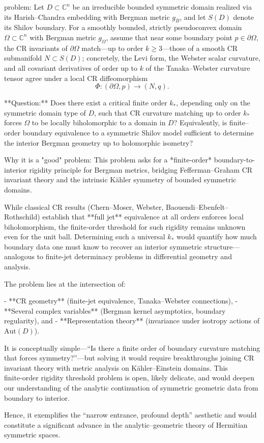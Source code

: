 problem:  
Let \( D \subset \mathbb{C}^n \) be an irreducible bounded symmetric domain realized via its Harish–Chandra embedding with Bergman metric \( g_B \), and let \( S(D) \) denote its Shilov boundary. For a smoothly bounded, strictly pseudoconvex domain \( \Omega \subset \mathbb{C}^n \) with Bergman metric \( g_\Omega \), assume that near some boundary point \( p \in \partial\Omega \), the CR invariants of \( \partial\Omega \) match—up to order \( k \ge 3 \)—those of a smooth CR submanifold \( N \subset S(D) \); concretely, the Levi form, the Webster scalar curvature, and all covariant derivatives of order up to \( k \) of the Tanaka–Webster curvature tensor agree under a local CR diffeomorphism 
\[
\Phi: (\partial\Omega, p) \to (N, q) .
\]
  
**Question:**  
Does there exist a critical finite order \( k_* \), depending only on the symmetric domain type of \( D \), such that CR curvature matching up to order \( k_* \) forces \( \Omega \) to be locally biholomorphic to a domain in \( D \)?  
Equivalently, is finite–order boundary equivalence to a symmetric Shilov model sufficient to determine the interior Bergman geometry up to holomorphic isometry?  

Why it is a "good" problem:  
This problem asks for a *finite-order* boundary-to-interior rigidity principle for Bergman metrics, bridging Fefferman–Graham CR invariant theory and the intrinsic Kähler symmetry of bounded symmetric domains.  

While classical CR results (Chern–Moser, Webster, Baouendi–Ebenfelt–Rothschild) establish that **full jet** equivalence at all orders enforces local biholomorphism, the finite‑order threshold for such rigidity remains unknown even for the unit ball. Determining such a universal \( k_* \) would quantify how much boundary data one must know to recover an interior symmetric structure—analogous to finite-jet determinacy problems in differential geometry and analysis.  

The problem lies at the intersection of:  

- **CR geometry** (finite‑jet equivalence, Tanaka–Webster connections),  
- **Several complex variables** (Bergman kernel asymptotics, boundary regularity), and  
- **Representation theory** (invariance under isotropy actions of \( \mathrm{Aut}(D) \)).  

It is conceptually simple—“Is there a finite order of boundary curvature matching that forces symmetry?”—but solving it would require breakthroughs joining CR invariant theory with metric analysis on Kähler–Einstein domains. This finite‑order rigidity threshold problem is open, likely delicate, and would deepen our understanding of the analytic continuation of symmetric geometric data from boundary to interior.  

Hence, it exemplifies the “narrow entrance, profound depth” aesthetic and would constitute a significant advance in the analytic–geometric theory of Hermitian symmetric spaces.